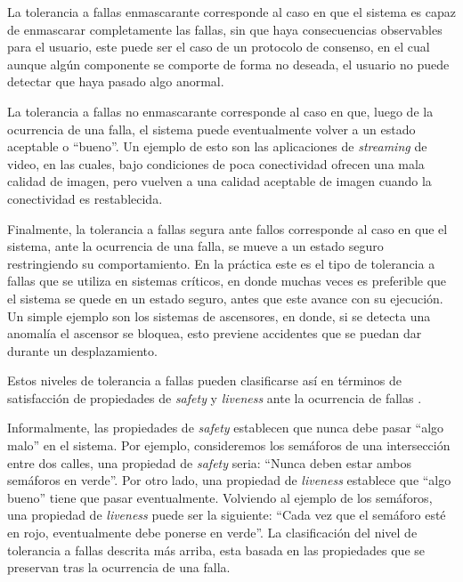 La tolerancia a fallas enmascarante corresponde al caso en que el sistema es capaz de enmascarar completamente las fallas, sin que haya consecuencias observables para el usuario, este puede ser el caso de un protocolo de consenso, en el cual aunque algún componente se comporte de forma no deseada, el usuario no puede detectar que haya pasado algo anormal.

La tolerancia a fallas no enmascarante corresponde al caso en que, luego de la ocurrencia de una falla, el sistema puede eventualmente volver a un estado aceptable o ``bueno''. Un ejemplo de esto son las aplicaciones de \textit{streaming} de video, en las cuales, bajo condiciones de poca conectividad ofrecen una mala calidad de imagen, pero vuelven a una calidad aceptable de imagen cuando la conectividad es restablecida.

Finalmente, la tolerancia a fallas segura ante fallos corresponde al caso en que el sistema, ante la ocurrencia de una falla, se mueve a un estado seguro restringiendo su comportamiento. En la práctica este es el tipo de tolerancia a fallas que se utiliza en sistemas críticos, en donde muchas veces es preferible que el sistema se quede en un estado seguro, antes que este avance con su ejecución. Un simple ejemplo son los sistemas de ascensores, en donde, si se detecta una anomalía el ascensor se bloquea, esto previene accidentes que se puedan dar durante un desplazamiento.

Estos niveles de tolerancia a fallas pueden clasificarse así en términos de satisfacción de propiedades de \textit{safety} y \textit{liveness} ante la ocurrencia de fallas \cite{Gartner99}.

Informalmente, las propiedades de \textit{safety} establecen que nunca debe pasar ``algo malo'' en el sistema. Por ejemplo, consideremos los semáforos de una intersección entre dos calles, una propiedad de \textit{safety} seria: ``Nunca deben estar ambos semáforos en verde''.
Por otro lado, una propiedad de \textit{liveness} establece que ``algo bueno'' tiene que pasar eventualmente. Volviendo al ejemplo de los semáforos, una propiedad de \textit{liveness} puede ser la siguiente: ``Cada vez que el semáforo esté en rojo, eventualmente debe ponerse en verde''.
La clasificación del nivel de tolerancia a fallas descrita más arriba, esta basada en las propiedades que se preservan tras la ocurrencia de una falla.

